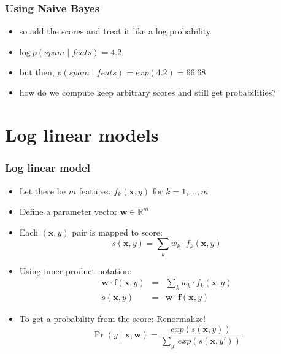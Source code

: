 \begin{frame}
\frametitle{Using Naive Bayes}
\begin{itemize}[<+->]
\item so add the scores and treat it like a log probability
\item $\textrm{log}\ p(\textit{spam} \mid \textit{feats}) = 4.2$
\item but then, $p(\textit{spam} \mid \textit{feats}) = exp(4.2) = 66.68$
\item how do we compute keep arbitrary scores and still get probabilities?
\end{itemize}
\end{frame}

\section{Log linear models}
\frame{\tableofcontents[currentsection]}

\begin{frame}
\frametitle{Log linear model}
\begin{itemize}[<+->]
\item Let there be $m$ features, $f_k(\textbf{x}, y)$ for $k = 1, \ldots, m$
\item Define a parameter vector $\textbf{w} \in \mathbb{R}^m$
\item Each $(\textbf{x}, y)$ pair is mapped to score:
\[ s(\textbf{x}, y) = \sum_k w_k \cdot f_k(\textbf{x}, y) \]
\item Using inner product notation:
\begin{eqnarray*}
\textbf{w} \cdot \textbf{f}(\textbf{x}, y) & = & \sum_k w_k \cdot f_k(\textbf{x}, y) \\
s(\textbf{x}, y) & = & \textbf{w} \cdot \textbf{f}(\textbf{x}, y) 
\end{eqnarray*}
\item To get a probability from the score: Renormalize! 
\[ \Pr(y \mid \textbf{x}, \textbf{w}) = \frac{exp\left(s(\textbf{x}, y)\right)}{\sum_{y'} exp\left(s(\textbf{x}, y')\right)} \]
\end{itemize}
\end{frame}

